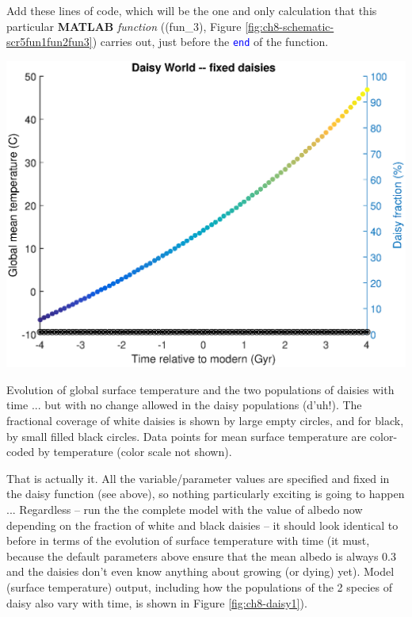 \documentclass{tufte-book} %
\begin{document}
Add these lines of code, which will be the one and only calculation that this particular \textbf{MATLAB} \textit{function} ((\textsf{fun\_3}), Figure \ref{fig:ch8-schematic-scr5fun1fun2fun3}) carries out, just before the \texttt{\textcolor{blue}{end}} of the function.

\begin{marginfigure}[-2.0in]
\includegraphics[width=\linewidth]{ch8-daisy1.eps}
\caption{Evolution of global surface temperature and the two populations of daisies with time ... but with no change allowed in the daisy populations (d'uh!). The fractional coverage of white daisies is shown by large empty circles, and for black, by small filled black circles. Data points for mean surface temperature are color-coded by temperature (color scale not shown).}
\label{fig:ch8-daisy1}
\end{marginfigure}

That is actually it. All the variable/parameter values are specified and fixed in the daisy function (see above), so nothing particularly exciting is going to happen ... Regardless -- run the the complete model with the value of albedo now depending on the fraction of white and black daisies  -- it should look identical to before in terms of the evolution of surface temperature with time (it must, because the default parameters above ensure that the mean albedo is always 0.3 and the daisies don't even know anything about growing (or dying) yet). Model (surface temperature) output, including how the populations of the 2 species of daisy also vary with time, is shown in Figure \ref{fig:ch8-daisy1}).
\end{document}
